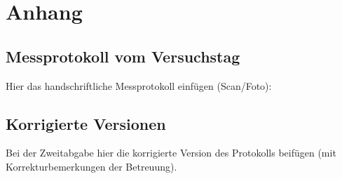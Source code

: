 \section{Anhang}
\label{sec:anhang}

\subsection{Messprotokoll vom Versuchstag}
Hier das handschriftliche Messprotokoll einfügen (Scan/Foto):


\subsection{Korrigierte Versionen}
Bei der Zweitabgabe hier die korrigierte Version des Protokolls
beifügen (mit Korrekturbemerkungen der Betreuung).
